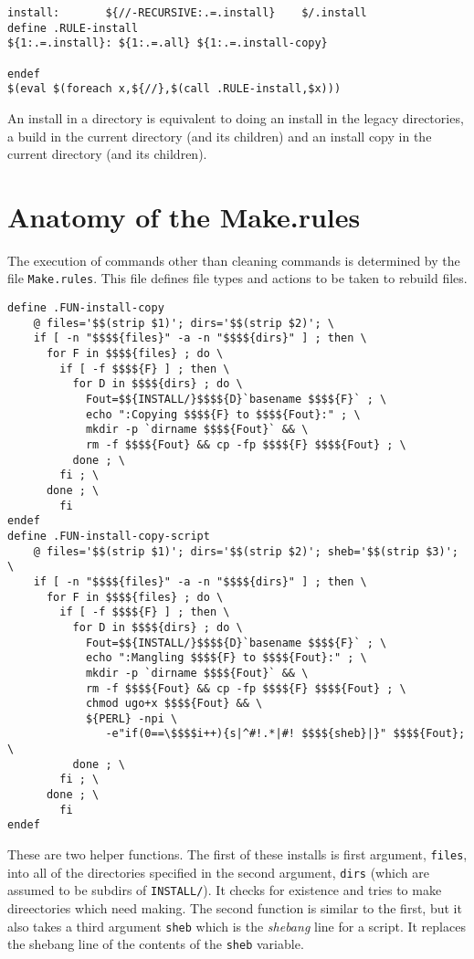 \documentclass[letterpaper]{article}
\begin{document}
\begin{verbatim}
install:       ${//-RECURSIVE:.=.install}    $/.install
define .RULE-install
${1:.=.install}: ${1:.=.all} ${1:.=.install-copy}

endef
$(eval $(foreach x,${//},$(call .RULE-install,$x)))
\end{verbatim}
An install in a directory is equivalent to doing an install in
the legacy directories, a build in the current directory (and
its children) and an install copy in the current directory
(and its children).

\section{Anatomy of the Make.rules}

The execution of commands other than cleaning commands is
determined by the file \verb+Make.rules+.  This file defines
file types and actions to be taken to rebuild files.

\begin{verbatim}
define .FUN-install-copy
	@ files='$$(strip $1)'; dirs='$$(strip $2)'; \
	if [ -n "$$$${files}" -a -n "$$$${dirs}" ] ; then \
	  for F in $$$${files} ; do \
	    if [ -f $$$${F} ] ; then \
	      for D in $$$${dirs} ; do \
	        Fout=$${INSTALL/}$$$${D}`basename $$$${F}` ; \
	        echo ":Copying $$$${F} to $$$${Fout}:" ; \
	        mkdir -p `dirname $$$${Fout}` && \
	        rm -f $$$${Fout} && cp -fp $$$${F} $$$${Fout} ; \
	      done ; \
	    fi ; \
	  done ; \
        fi
endef
define .FUN-install-copy-script
	@ files='$$(strip $1)'; dirs='$$(strip $2)'; sheb='$$(strip $3)'; \
	if [ -n "$$$${files}" -a -n "$$$${dirs}" ] ; then \
	  for F in $$$${files} ; do \
	    if [ -f $$$${F} ] ; then \
	      for D in $$$${dirs} ; do \
	        Fout=$${INSTALL/}$$$${D}`basename $$$${F}` ; \
	        echo ":Mangling $$$${F} to $$$${Fout}:" ; \
	        mkdir -p `dirname $$$${Fout}` && \
	        rm -f $$$${Fout} && cp -fp $$$${F} $$$${Fout} ; \
	        chmod ugo+x $$$${Fout} && \
	        ${PERL} -npi \
	           -e"if(0==\$$$$i++){s|^#!.*|#! $$$${sheb}|}" $$$${Fout}; \
	      done ; \
	    fi ; \
	  done ; \
        fi
endef
\end{verbatim}
These are two helper functions.  The first of these installs is first
argument, \verb+files+, into all of the directories specified in the
second argument, \verb+dirs+ (which are assumed to be subdirs of
\verb+INSTALL/+).  It checks for existence and tries to make
direectories which need making.  The second function is similar to the
first, but it also takes a third argument \verb+sheb+ which is the
{\em shebang} line for a script.  It replaces the shebang line of the
contents of the \verb+sheb+ variable.
\end{document}
